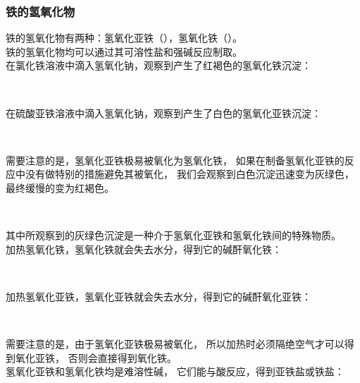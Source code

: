 \documentclass[UTF8]{ctexart}
\begin{document}
\newpage

\subsubsection{铁的氢氧化物}
    铁的氢氧化物有两种：氢氧化亚铁（），氢氧化铁（）。\\[3mm]
    铁的氢氧化物均可以通过其可溶性盐和强碱反应制取。\\[3mm]
    在氯化铁溶液中滴入氢氧化钠，观察到产生了红褐色的氢氧化铁沉淀：
    \begin{center}
        \\[3mm]
    \end{center}    
    在硫酸亚铁溶液中滴入氢氧化钠，观察到产生了白色的氢氧化亚铁沉淀：
    \begin{center}
        \\[4mm]
    \end{center}    
    需要注意的是，氢氧化亚铁极易被氧化为氢氧化铁，
    如果在制备氢氧化亚铁的反应中没有做特别的措施避免其被氧化，
    我们会观察到白色沉淀迅速变为灰绿色，
    最终缓慢的变为红褐色。
    \begin{center}
        \\[3mm]
    \end{center}
    其中所观察到的灰绿色沉淀是一种介于氢氧化亚铁和氢氧化铁间的特殊物质。\\[10mm]
    加热氢氧化铁，氢氧化铁就会失去水分，得到它的碱酐氧化铁：
    \begin{center}
        \\[3mm]
    \end{center}
    加热氢氧化亚铁，氢氧化亚铁就会失去水分，得到它的碱酐氧化亚铁：
    \begin{center}
        \\[3mm]
    \end{center}
    需要注意的是，由于氢氧化亚铁极易被氧化，
    所以加热时必须隔绝空气才可以得到氧化亚铁，
    否则会直接得到氧化铁。\\[10mm]
    氢氧化亚铁和氢氧化铁均是难溶性碱，
    它们能与酸反应，得到亚铁盐或铁盐：
    \begin{center}
        \\[3mm]
    \end{center}
\end{document}
